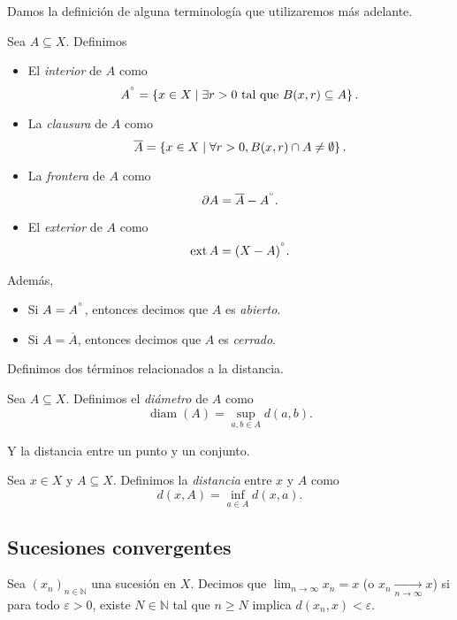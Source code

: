 \documentclass[11pt]{article}
\begin{document}
Damos la definición de alguna terminología que utilizaremos más adelante.

\begin{definition}
    Sea $A \subseteq X$. Definimos
    \begin{itemize}
        \item El \emph{interior} de $A$ como 
        $$
            A^{\degree} = \left\{  x \in X \mid \exists r > 0 \text{ tal que } B(x, r) \subseteq A \right\}.
        $$
        \item La \emph{clausura} de $A$ como
        $$
            \overline{A} = \left\{  x \in X \mid \forall r > 0, B(x, r) \cap A \neq \emptyset \right\}.
        $$
        \item La \emph{frontera} de $A$ como
        $$
            \partial A = \overline{A} - A^{\degree}.
        $$
        \item El \emph{exterior} de $A$ como
        $$
            \operatorname{ext} A = (X - A)^{\degree}.
        $$
    \end{itemize}
    Además, 
    \begin{itemize}
        \item Si $A = A^{\degree}$, entonces decimos que $A$ es \emph{abierto}.
        \item Si $A = \overline{A}$, entonces decimos que $A$ es \emph{cerrado}.
    \end{itemize}
\end{definition}

Definimos dos términos relacionados a la distancia.

\begin{definition}
    Sea $A \subseteq X$. Definimos el \emph{diámetro} de $A$ como
    $$
        \operatorname{diam}(A) = \sup_{a, b \in A} d(a, b).
    $$
\end{definition}

Y la distancia entre un punto y un conjunto.

\begin{definition}
    Sea $x \in X$ y $A \subseteq X$. Definimos la \emph{distancia} entre $x$ y $A$ como
    $$
        d(x, A) = \inf_{a \in A} d(x, a).
    $$
\end{definition}

\subsection{Sucesiones convergentes}

\begin{definition}
    Sea $(x_n)_{n \in \mathbb{N}}$ una sucesión en $X$. Decimos que $\lim_{n \to \infty} x_{n} = x$ (o $x_{n} \xrightarrow[n \to \infty]{} x$) si para todo $\varepsilon > 0$, existe $N \in \mathbb{N}$ tal que $n \geq N$ implica $d(x_n, x) < \varepsilon$.
\end{definition}
\end{document}
